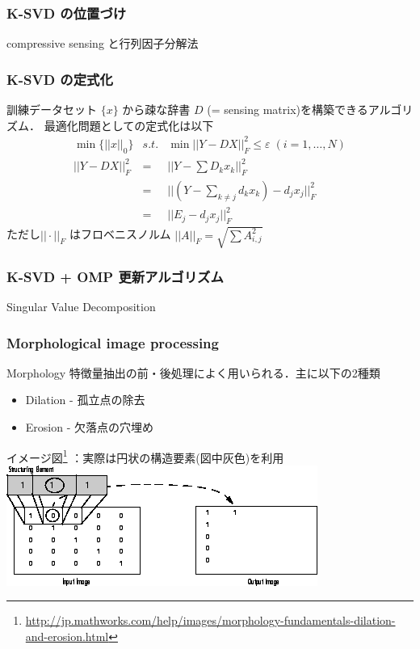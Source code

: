 \begin{frame}\frametitle{K-SVD の位置づけ}
compressive sensing と行列因子分解法
\end{frame}


\begin{frame}\frametitle{K-SVD の定式化}
\label{ksvd}

訓練データセット $\{ x \}$ から疎な辞書 $D$ (= sensing matrix)を構築できるアルゴリズム．
最適化問題としての定式化は以下
\begin{eqnarray}
    \min \{||x||_0\} &s.t.& \min ||Y-DX||^2_F \leq \varepsilon \; (i = 1, \dots, N) \\
    ||Y-DX||^2_F &=& ||Y - \sum D_k x_k||^2_F \\
    &=& ||(Y - \sum_{k \neq j} d_k x_k) - d_j x_j||^2_F \\
    &=& ||E_j - d_j x_j||^2_F
\end{eqnarray}
ただし$||\cdot||_F$ はフロベニスノルム $||A||_F = \sqrt{\sum{A^2_{i,j}}}$
\end{frame}


\begin{frame}\frametitle{K-SVD + OMP 更新アルゴリズム}
\end{frame}


\begin{frame}{Singular Value Decomposition}
\end{frame}



\begin{frame}\frametitle{Morphological image processing}
\begin{block}{Morphology}
特徴量抽出の前・後処理によく用いられる．主に以下の2種類
\begin{itemize}
    \item Dilation - 孤立点の除去
    \item Erosion - 欠落点の穴埋め
\end{itemize}
\end{block}

イメージ図\footnote
{\url{http://jp.mathworks.com/help/images/morphology-fundamentals-dilation-and-erosion.html}}
：実際は円状の構造要素(図中灰色)を利用
\includegraphics[scale=0.4]{figure/morph.png}
\end{frame}
